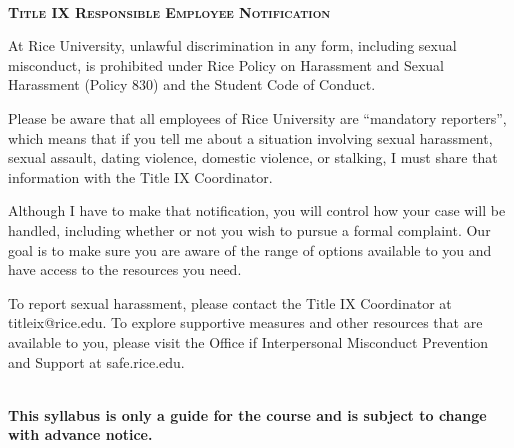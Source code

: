 \documentclass[11pt]{article}
\begin{document}
~\\
\textbf{\textsc{Title IX Responsible Employee Notification}}
\begin{adjustwidth}{1cm}{0cm}
  At Rice University, unlawful discrimination in any form, including sexual misconduct, is prohibited under Rice Policy on Harassment and Sexual Harassment (Policy 830) and the Student Code of Conduct.

  Please be aware that all employees of Rice University are ``mandatory reporters'', which means that if you tell me about a situation involving sexual harassment, sexual assault, dating violence, domestic violence, or stalking, I must share that information with the Title IX Coordinator.

  Although I have to make that notification, you will control how your case will be handled, including whether or not you wish to pursue a formal complaint. Our goal is to make sure you are aware of the range of options available to you and have access to the resources you need.

  To report sexual harassment, please contact the Title IX Coordinator at titleix@rice.edu. To explore supportive measures and other resources that are available to you, please visit the Office if Interpersonal Misconduct Prevention and Support at safe.rice.edu.
\end{adjustwidth}

~\\
\textbf{This syllabus is only a guide for the course and is subject to change with advance notice.}
\end{document}
